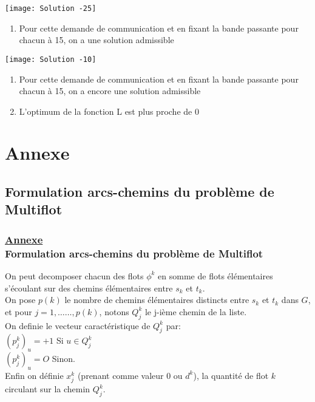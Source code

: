 \documentclass[t,10pt]{beamer}
\begin{document}
    \begin{frame}
        \vspace{0.5cm}
        \texttt{[image: Solution -25]}
        \vspace{0.5cm}
        \begin{enumerate}
            \item Pour cette demande de communication  et en fixant la bande passante pour chacun à 15, on a une solution admissible
        \end{enumerate}
    \end{frame}

    \begin{frame}
        \vspace{0.5cm}
        \texttt{[image: Solution -10]}
        \vspace{0.5cm}
        \begin{enumerate}
            \item Pour cette demande de communication  et en fixant la bande passante pour chacun à 15, on a encore une solution admissible
            \item L'optimum de la fonction L est plus proche de 0
        \end{enumerate}
    \end{frame}

    \begin{frame}

    \end{frame}

    \section{Annexe}

    \subsection{Formulation arcs-chemins du problème de Multiflot}
    \begin{frame}\frametitle{\underline{Annexe} \\ \small Formulation arcs-chemins du problème de Multiflot}
        On peut decomposer chacun des flots $\phi^{k}$ en somme de flots élémentaires s'écoulant sur
        des chemins élémentaires entre $s_{k}$ et $t_{k}$.
        \\
        On pose $p(k)$ le nombre de chemins élémentaires distincts entre $s_{k}$ et $t_{k}$ dans $G$,
        et pour $j = 1,\dots \dots,p(k)$, notons $Q^{k}_{j}$ le j-ième chemin de la liste.
        \\
        On definie le vecteur caractéristique de $Q^{k}_{j}$ par:
        \\
        \vspace{0.2cm}
        $(p_{j}^{k})_{u} = +1$ Si $u \in Q^{k}_{j}$ \\
        $(p_{j}^{k})_{u} = O$ Sinon.
        \\
        \vspace{0.2cm}
        Enfin on définie $x_{j}^{k}$ (prenant comme valeur $0$ ou $d^{k}$),
        la quantité de flot $k$ circulant sur la chemin $Q^{k}_{j}$.
    \end{frame}
\end{document}
